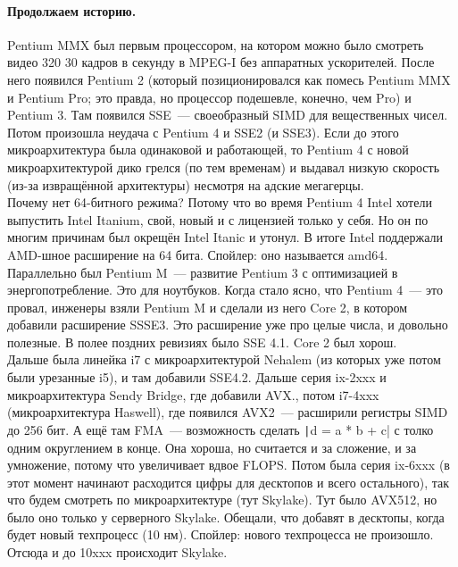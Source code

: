 \documentclass{article}
\begin{document}
    \paragraph{Продолжаем историю.}
    Pentium MMX был первым процессором, на котором можно было смотреть видео 320 30 кадров в секунду в MPEG-I без аппаратных ускорителей. После него появился Pentium 2 (который позиционировался как помесь Pentium MMX и Pentium Pro; это правда, но процессор подешевле, конечно, чем Pro) и Pentium 3. Там появился SSE~--- своеобразный SIMD для вещественных чисел. Потом произошла неудача с Pentium 4 и SSE2 (и SSE3). Если до этого микроархитектура была одинаковой и работающей, то Pentium 4 с новой микроархитектурой дико грелся (по тем временам) и выдавал низкую скорость (из-за извращённой архитектуры) несмотря на адские мегагерцы.\\
    Почему нет 64-битного режима? Потому что во время Pentium 4 Intel хотели выпустить Intel Itanium, свой, новый и с лицензией только у себя. Но он по многим причинам был окрещён Intel Itanic и утонул. В итоге Intel поддержали AMD-шное расширение на 64 бита. Спойлер: оно называется amd64.\\
    Параллельно был Pentium M~--- развитие Pentium 3 с оптимизацией в энергопотребление. Это для ноутбуков. Когда стало ясно, что Pentium 4~--- это провал, инженеры взяли Pentium M и сделали из него Core 2, в котором добавили расширение SSSE3. Это расширение уже про целые числа, и довольно полезные. В полее поздних ревизиях было SSE 4.1. Core 2 был хорош.\\
    Дальше была линейка i7 с микроархитектурой Nehalem (из которых уже потом были урезанные i5), и там добавили SSE4.2. Дальше серия ix-2xxx и микроархитектура Sendy Bridge, где добавили AVX., потом i7-4xxx (микроархитектура Haswell), где появился AVX2~--- расширили регистры SIMD до 256 бит. А ещё там FMA~--- возможность сделать \texttt|d = a * b + c| с толко одним округлением в конце. Она хороша, но считается и за сложение, и за умножение, потому что увеличивает вдвое FLOPS. Потом была серия ix-6xxx (в этот момент начинают расходится цифры для десктопов и всего остального), так что будем смотреть по микроархитектуре (тут Skylake). Тут было AVX512, но было оно только у серверного Skylake. Обещали, что добавят в десктопы, когда будет новый техпроцесс (10 нм). Спойлер: нового техпроцесса не произошло.\\
    Отсюда и до 10xxx происходит Skylake.\\
\end{document}
